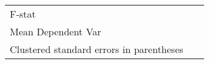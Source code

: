 {\begin{tabular}{l*{10}{c}}
F-stat              &                     &                     &                     &                     &                     &                     &                     &                     &                     &                     \\
Mean Dependent Var  &                     &                     &                     &                     &                     &                     &                     &                     &                     &                     \\
\hline\hline
\multicolumn{11}{l}{\footnotesize Clustered standard errors in parentheses}\\
\end{tabular}
}
